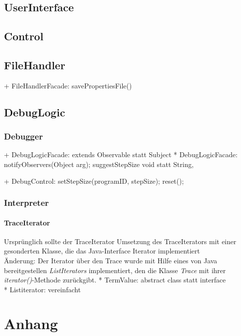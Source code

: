 \documentclass[parskip=full]{scrartcl}
\begin{document}
\subsection{UserInterface}
\subsection{Control}
\subsection{FileHandler}
+ FileHandlerFacade: savePropertiesFile()
\subsection{DebugLogic}
\subsubsection{Debugger}

+ DebugLogicFacade: extends Observable statt Subject
* DebugLogicFacade: notifyObservers(Object arg); suggestStepSize void statt String,

+ DebugControl: setStepSize(programID, stepSize); reset();
\subsubsection{Interpreter}
\paragraph{TraceIterator}
Ursprünglich sollte der TraceIterator Umsetzung des TraceIterators mit einer gesonderten Klasse, die das Java-Interface Iterator implementiert \\
Änderung: Der Iterator über den Trace wurde mit Hilfe eines von Java bereitgestellen \textit{ListIterators} implementiert, den die Klasse \textit{Trace} mit ihrer \textit{iterator()}-Methode zurückgibt.
* TermValue: abstract class statt interface \\
* Listiterator: vereinfacht

\section{Anhang}
\end{document}
